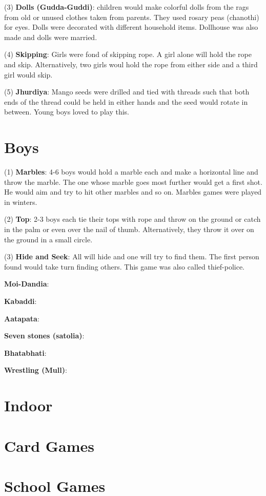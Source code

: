 (3) \textbf{Dolls (Gudda-Guddi)}: children would make colorful dolls from the rags from old or unused clothes taken from parents. They used rosary peas (chanothi) for eyes. Dolls were decorated with different household items. Dollhouse was also made and dolls were married. 

(4) \textbf{Skipping}: Girls were fond of skipping rope. A girl alone will hold the rope and skip. Alternatively, two girls woul hold the rope from either side and a third girl would skip. 

(5) \textbf{Jhurdiya}: Mango seeds were drilled and tied with threads such that both ends of the thread could be held in either hands and the seed would rotate in between. Young boys loved to play this.


\section{Boys}

(1) \textbf{Marbles}: 4-6 boys would hold a marble each and make a horizontal line and throw the marble. The one whose marble goes most further would get a first shot. He would aim and try to hit other marbles and so on. Marbles games were played in winters.

(2) \textbf{Top}: 2-3 boys each tie their tops with rope and throw on the ground or catch in the palm or even over the nail of thumb. Alternatively, they throw it over on the ground in a small circle.

(3) \textbf{Hide and Seek}: All will hide and one will try to find them. The first person found would take turn finding others. This game was also called thief-police.

\textbf{Moi-Dandia}: 

\textbf{Kabaddi}:

\textbf{Aatapata}:

\textbf{Seven stones (satolia)}:

\textbf{Bhatabhati}:

\textbf{Wrestling (Mull)}:

\section{Indoor}

\section{Card Games}

\section{School Games}

